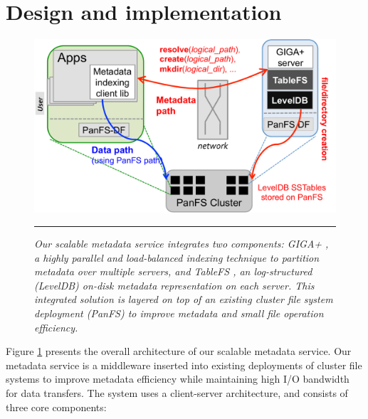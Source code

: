 \section{Design and implementation}

\begin{figure}[t]   %
\centerline{\includegraphics[scale=0.4]{./figs/giga-impl-leveldb-clusterfs}}
\vspace{10pt}
\caption{\textit{\footnotesize
Our scalable metadata service integrates two components: GIGA+ \cite{GIGA11},
a highly parallel and load-balanced indexing technique 
to partition metadata over multiple servers, and TableFS \cite{TableFS},
an log-structured (LevelDB) on-disk metadata representation on each server.
This integrated solution is layered on top of an existing cluster
file system deployment (PanFS) to improve metadata
and small file operation efficiency.
}}
\hrule
\label{fig:design}
\end{figure}       %

Figure \ref{fig:design} presents the overall architecture of our scalable
metadata service. Our metadata service is a middleware inserted into
existing deployments of cluster file systems to improve metadata efficiency
while maintaining high I/O bandwidth for data transfers.
The system uses a client-server architecture,
and consists of three core components:

